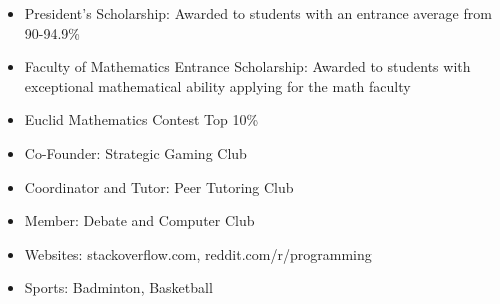 \documentclass[10pt]{article}
\begin{document}
\begin{minipage}[t]{0.84\linewidth}
	\begin{itemize}
		\item President's Scholarship: Awarded to students with an entrance average from 90-94.9\%
		\item Faculty of Mathematics Entrance Scholarship: Awarded to students with exceptional mathematical ability applying for the math faculty
		\item Euclid Mathematics Contest Top 10\%
	\end{itemize} \vspace{24pt}
	
	\begin{itemize}
		\item Co-Founder: Strategic Gaming Club
		\item Coordinator and Tutor: Peer Tutoring Club
		\item Member: Debate and Computer Club
		\item Websites: stackoverflow.com, reddit.com/r/programming
		\item Sports: Badminton, Basketball 
	\end{itemize} 
\end{minipage}
	
\end{document}
